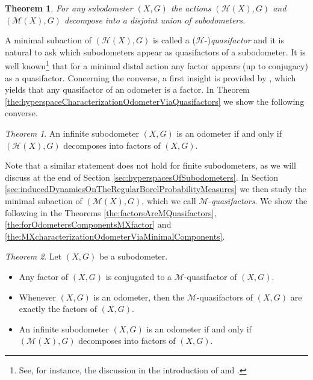 \documentclass[12pt, reqno]{amsart}
\newtheorem{theorem}{Theorem}[section]
\theoremstyle{definition}
\theoremstyle{remark}
\numberwithin{equation}{section}
\theoremstyle{theorem}
\newtheorem*{theorem*}{Theorem}
\theoremstyle{remark}
\def\hyper{{\mathcal{H}}}
\begin{document}
\begin{theorem}
\label{the:INTROInducedDynamicsOfSubodometerDecompose}
    For any subodometer $(X,G)$ the actions $(\hyper(X),G)$ and $(\mathcal{M}(X),G)$ decompose into a disjoint union of subodometers. 
\end{theorem}

A minimal subaction of $(\hyper(X),G)$ is called a ($\hyper$-)\emph{quasifactor} \cite{glasner1975compressibility,auslander1988minimal} and it is natural to ask which subodometers appear as quasifactors of a subodometer. 
It is well known\footnote{
    See, for instance, the discussion in the introduction of \cite{glasner1995quasifactors} and \cite[Theorem~7.3]{auslander1988minimal}.} 
that for a minimal distal action any factor appears (up to conjugacy) as a quasifactor. 
Concerning the converse, a first insight is provided by \cite[Corollary 11.20]{auslander1988minimal}, which yields that any quasifactor of an odometer is a factor. 
In Theorem \ref{the:hyperspaceCharacterizationOdometerViaQuasifactors} we show the following converse. 

\begin{theorem*}
    An infinite subodometer $(X,G)$ is an odometer if and only if $(\hyper(X),G)$ decomposes into factors of $(X,G)$. 
\end{theorem*}

Note that a similar statement does not hold for finite subodometers, as we will discuss at the end of Section \ref{sec:hyperspacesOfSubodometers}. 
In Section \ref{sec:inducedDynamicsOnTheRegularBorelProbabilityMeasures} we then study the minimal subaction of $(\mathcal{M}(X),G)$, which we call $\mathcal{M}$-\emph{quasifactors}. 
We show the following in the Theorems \ref{the:factorsAreMQuasifactors}, \ref{the:forOdometersComponentsMXfactor} and \ref{the:MXcharacterizationOdometerViaMinimalComponents}. 

\begin{theorem*}
    Let $(X,G)$ be a subodometer. 
    \begin{itemize}
        \item[(i)] 
        Any factor of $(X,G)$ is conjugated to a $\mathcal{M}$-quasifactor of $(X,G)$.
        \item[(ii)]
        Whenever $(X,G)$ is an odometer, then the $\mathcal{M}$-quasifactors of $(X,G)$ are exactly the factors of $(X,G)$.
        \item[(iii)] 
        An infinite subodometer $(X,G)$ is an odometer if and only if $(\mathcal{M}(X),G)$ decomposes into factors of $(X,G)$. 
    \end{itemize}
\end{theorem*}
\end{document}
